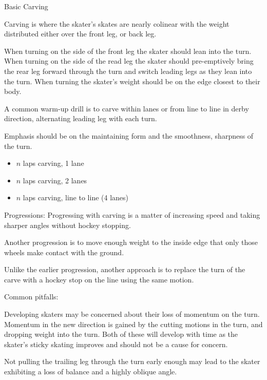 Basic Carving


Carving is where the skater's skates are nearly colinear with the weight distributed either over the front leg, or back leg.  


When turning on the side of the front leg the skater should lean into the turn.  
When turning on the side of the read leg the skater should pre-emptively bring the rear leg forward through the turn and switch leading legs as they lean into the turn.  
When turning the skater's weight should be on the edge closest to their body.   

A common warm-up drill is to carve within lanes or from line to line in derby direction, alternating leading leg with each turn.    

Emphasis should be on the maintaining form and the smoothness, sharpness of the turn. 

\begin{itemize}
\item $n$ laps carving, 1 lane 
\item $n$ laps carving, 2 lanes
\item $n$ laps carving, line to line (4 lanes)
\end{itemize}


Progressions:
Progressing with carving is a matter of increasing speed and taking sharper angles without hockey stopping.   

Another progression is to move enough weight to the inside edge that only those wheels make contact with the ground.     

Unlike the earlier progression, another approach is to replace the turn of the carve with a hockey stop on the line using the same motion.  

Common pitfalls:

Developing skaters may be concerned about their loss of momentum on the turn. 
Momentum in the new direction is gained by the cutting motions in the turn, and dropping weight into the turn.   
Both of these will develop with time as the skater's sticky skating improves and should not be a cause for concern.


Not pulling the trailing leg through the turn early enough may lead to the skater exhibiting a loss of balance and a highly oblique angle.   

